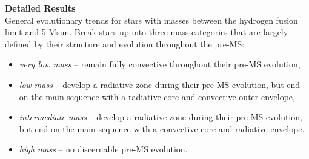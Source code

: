 \textbf{Detailed Results} \\
General evolutionary trends for stars with masses between the hydrogen fusion limit and 5 Msun. Break stars up into three mass categories that are largely defined by their structure and evolution throughout the pre-MS: 
\begin{itemize}
 \item[] {\it very low mass} -- remain fully convective throughout their pre-MS evolution,
 \item[] {\it low mass} -- develop a radiative zone during their pre-MS evolution, but end on the main sequence with a radiative core and convective outer envelope,
 \item[] {\it intermediate mass} -- develop a radiative zone during their pre-MS evolution, but end on the main sequence with a convective core and radiative envelope.
 \item[] {\it high mass} -- no discernable pre-MS evolution.
\end{itemize}